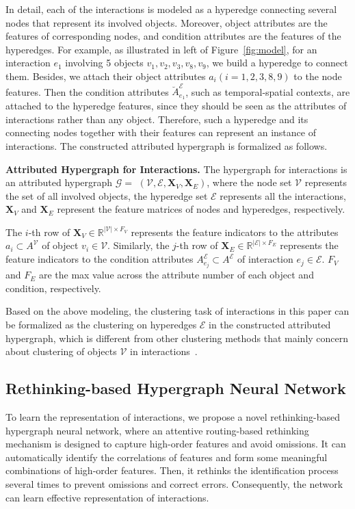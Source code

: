 \documentclass[11pt]{article}
\begin{document}
In detail, each of the interactions is modeled as a hyperedge connecting several nodes that represent its involved objects.
Moreover, object attributes are the features of corresponding nodes, and condition attributes are the features of the hyperedges.
For example, as illustrated in left of Figure~\ref{fig:model}, for an interaction $ e_1 $ involving 5 objects $ v_1, v_2, v_3, v_8, v_9 $, we build a hyperedge to connect them. Besides, we attach their object attributes $ a_i (i=1,2,3,8,9) $ to the node features. Then the condition attributes $ \breve{A}_{e_1}^\mathcal{E} $, such as temporal-spatial contexts, are attached to the hyperedge features, since they should be seen as the attributes of interactions rather than any object. Therefore, such a hyperedge and its connecting nodes together with their features can represent an instance of interactions.
The constructed attributed hypergraph is formalized as follows.
\begin{definition}   \label{def:hypergraph}
	\textbf{Attributed Hypergraph for Interactions. }
	The hypergraph for interactions is an attributed hypergraph $\mathcal{G}=$ $(\mathcal{V}, \mathcal{E}, \boldsymbol{X}_V, \boldsymbol{X}_E)$, where the node set $\mathcal{V}$ represents the set of all involved objects, the hyperedge set $\mathcal{E}$ represents all the interactions, $\boldsymbol{X}_V$ and $\boldsymbol{X}_E$ represent the feature matrices of nodes and hyperedges, respectively.
\end{definition}
The $i$-th row of $\boldsymbol{X}_V \in \mathbb{R}^{|\mathcal{V}| \times F_V}$ represents the feature indicators to the  attributes $ a_i \subset A^\mathcal{V} $ of object $ v_i \in \mathcal{V} $. Similarly, the $j$-th row of $\boldsymbol{X}_E \in \mathbb{R}^{|\mathcal{E}| \times F_E}$ represents the feature indicators to the condition attributes $ A^\mathcal{E}_{e_j} \subset A^\mathcal{E} $ of interaction $ e_j \in \mathcal{E} $. $F_V$ and $F_E$ are the max value across the attribute number of each object and condition, respectively.

Based on the above modeling, the clustering task of interactions in this paper can be formalized as the clustering on hyperedges $\mathcal{E}$ in the constructed attributed hypergraph, which is different from other clustering methods that mainly concern about clustering of objects $\mathcal{V}$ in interactions~\cite{hu_adaptive_2021}.


\subsection{Rethinking-based Hypergraph Neural Network}    \label{mod:hgnn}
To learn the representation of interactions, we propose a novel rethinking-based hypergraph neural network, where an attentive routing-based rethinking mechanism is designed to capture high-order features and avoid omissions. It can automatically identify the correlations of features and form some meaningful combinations of high-order features. Then, it rethinks the identification process several times to prevent omissions and correct errors. Consequently, the network can learn effective representation of interactions.
\end{document}
